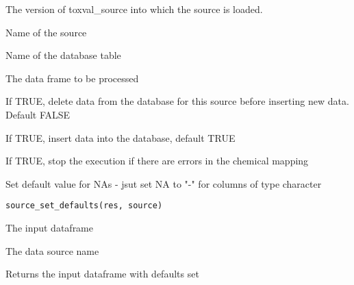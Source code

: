 \documentclass[letterpaper]{book}
\begin{document}
\begin{Arguments}
\begin{ldescription}
\item[\code{db}] The version of toxval\_source into which the source is loaded.

\item[\code{source}] Name of the source

\item[\code{table}] Name of the database table

\item[\code{res}] The data frame to be processed

\item[\code{do.reset}] If TRUE, delete data from the database for this source before
inserting new data. Default FALSE

\item[\code{do.insert}] If TRUE, insert data into the database, default TRUE

\item[\code{chem.check.halt}] If TRUE, stop the execution if there are errors in the
chemical  mapping
\end{ldescription}
\end{Arguments}
%
\begin{Description}\relax
Set default value for NAs - jsut set NA to "-" for columns of type character
\end{Description}
%
\begin{Usage}
\begin{verbatim}
source_set_defaults(res, source)
\end{verbatim}
\end{Usage}
%
\begin{Arguments}
\begin{ldescription}
\item[\code{res}] The input dataframe

\item[\code{source}] The data source name
\end{ldescription}
\end{Arguments}
%
\begin{Value}
Returns the input dataframe with defaults set
\end{Value}
\end{document}
